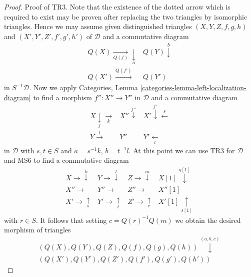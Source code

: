 \begin{proof}
\medskip\noindent
Proof of TR3. Note that the existence of the dotted arrow which is
required to exist may be proven after replacing the two triangles
by isomorphic triangles. Hence we may assume given distinguished
triangles $(X, Y, Z, f, g, h)$ and $(X', Y', Z', f', g', h')$ of
$\mathcal{D}$ and a commutative diagram
$$
\begin{array}{cc}Q(X) \underset{Q(f)}{\longrightarrow}\underset{a}{\downarrow} & Q(Y) \overset{b}{\downarrow} \\ Q(X') \overset{Q(f')}{\longrightarrow} & Q(Y')\end{array}
$$
in $S^{-1}\mathcal{D}$. Now we apply
Categories, Lemma \ref{categories-lemma-left-localization-diagram}
to find a morphism $f'' : X'' \to Y''$ in $\mathcal{D}$ and a commutative
diagram
$$
\begin{array}{ccc}X \underset{f}{\downarrow}\underset{k}{\longrightarrow} & X'' \overset{f''}{\downarrow} & X' \overset{f'}{\downarrow}\overset{s}{\longleftarrow} \\ Y \overset{l}{\longrightarrow} & Y'' & Y' \underset{t}{\longleftarrow}\end{array}
$$
in $\mathcal{D}$ with $s, t \in S$ and $a = s^{-1}k$, $b = t^{-1}l$.
At this point we can use TR3 for $\mathcal{D}$ and MS6 to find
a commutative diagram
$$
\begin{array}{cccc}X \longrightarrow\overset{k}{\downarrow} & Y \longrightarrow\overset{l}{\downarrow} & Z \longrightarrow\overset{m}{\downarrow} & X[1] \overset{g[1]}{\downarrow} \\ X'' \longrightarrow & Y'' \longrightarrow & Z'' \longrightarrow & X''[1] \\ X' \longrightarrow\underset{s}{\uparrow} & Y' \longrightarrow\underset{t}{\uparrow} & Z' \longrightarrow\underset{r}{\uparrow} & X'[1] \underset{s[1]}{\uparrow}\end{array}
$$
with $r \in S$. It follows that setting $c = Q(r)^{-1}Q(m)$ we obtain
the desired morphism of triangles
$$
\begin{array}{c}(Q(X), Q(Y), Q(Z), Q(f), Q(g), Q(h))
\overset{(a, b, c)}{\downarrow} \\ (Q(X'), Q(Y'), Q(Z'), Q(f'), Q(g'), Q(h'))\end{array}
$$


\end{proof}

